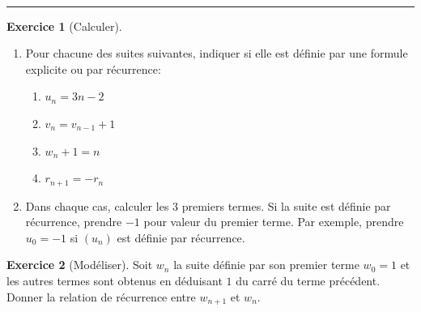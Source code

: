 \documentclass{exam}
\theoremstyle{definition}
\newtheorem{exercice}{Exercice}
\begin{document}
\Large

\vspace{5mm}

\begin{center}
\end{center}

~\\



\medskip\hrule

\begin{exercice}[Calculer]
    \begin{enumerate}
    \item Pour chacune des suites suivantes, indiquer si elle est définie par une formule explicite ou par récurrence:
    \begin{enumerate}
        \item $u_n = 3n - 2$

        \hrulefill
        \item $v_{n} = v_{n-1} + 1$

        \hrulefill
        \item $w_{n} + 1 = n$
        
        \hrulefill
        \item $r_{n+1} = -r_n$

        \hrulefill
    \end{enumerate}
    
    \item Dans chaque cas, calculer les 3 premiers termes. Si la suite est définie par récurrence, prendre $-1$ pour valeur du premier terme. Par exemple, prendre $u_0 = -1$ si $(u_n)$ est définie par récurrence.
    \end{enumerate}
    \begin{center}
    \end{center}
\end{exercice}

\begin{exercice}[Modéliser]
    Soit $w_n$ la suite définie par son premier terme $w_0 = 1$ et les autres termes sont obtenus en déduisant $1$ du carré du terme précédent. Donner la relation de récurrence entre $w_{n+1}$ et $w_n$.
\end{exercice}
\begin{center}
\end{center}
\end{document}

